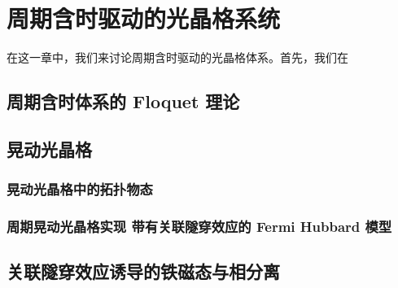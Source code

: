 \chapter{周期含时驱动的光晶格系统}

在这一章中，我们来讨论周期含时驱动的光晶格体系。首先，我们在


\section{周期含时体系的 Floquet 理论}


\section{晃动光晶格}


\subsection{晃动光晶格中的拓扑物态}


\subsection{周期晃动光晶格实现 带有关联隧穿效应的 Fermi Hubbard 模型}


\section{关联隧穿效应诱导的铁磁态与相分离}